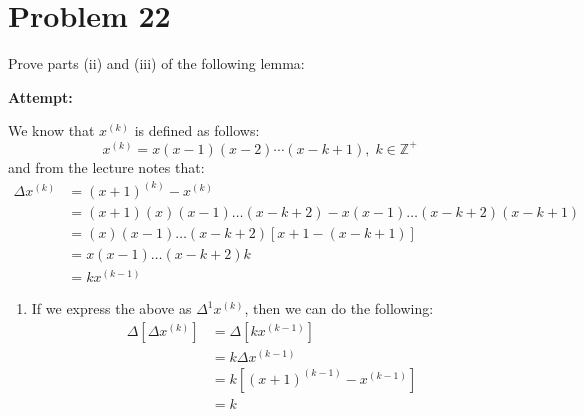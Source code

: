 \documentclass[12pt,letterpaper]{article}
\theoremstyle{definition}
\begin{document}
\newpage

\section*{Problem 22}

Prove parts (ii) and (iii) of the following lemma:


\textbf{Attempt:}
\begin{changemargin}{.5cm}{0cm}

We know that $x^{(k)}$ is defined as follows:
\begin{equation*}
    x^{(k)}=x(x-1)(x-2)\cdots(x-k+1), \; k\in\mathbb{Z}^+
\end{equation*}
and from the lecture notes that:
\begin{align*}
    \Delta x^{(k)} &= (x+1)^{(k)}-x^{(k)}\\
                    &=(x+1)(x)(x-1)\dots(x-k+2)-x(x-1)\dots(x-k+2)(x-k+1)\\
                    &=(x)(x-1)\dots(x-k+2)[x+1-(x-k+1)]\\
                    &=x(x-1)\dots(x-k+2)k\\
                    &=kx^{(k-1)}
\end{align*}

\begin{enumerate}[label=(\roman*)]
    \item If we express the above as $\Delta^1 x^{(k)}$, then we can do the following:
    \begin{align*}
        \Delta\left[\Delta x^{(k)}\right] &= \Delta \left[ kx^{(k-1)} \right]\\
        &= k \Delta x^{(k-1)}\\
        &= k \left[(x+1)^{(k-1)} - x^{(k-1)}\right]\\
        &= k 
    \end{align*}
\end{enumerate}

\end{changemargin}
\newpage
\end{document}
